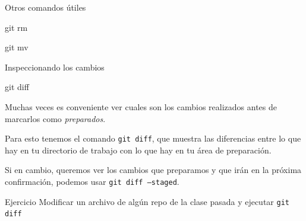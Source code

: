 \begin{frame}[t]{Otros comandos útiles}
    \begin{comando}
        git rm
    \end{comando}


    \vspace{2em}

    \begin{comando}
        git mv
    \end{comando}

\end{frame}

\begin{frame}[t]{Inspeccionando los cambios}
    \begin{comando}
        git diff
    \end{comando}

    \pause
    \begin{block}{}
        Muchas veces es conveniente ver cuales son los cambios realizados antes de marcarlos como \textit{preparados}.

        Para esto tenemos el comando \texttt{git diff}, que muestra las diferencias entre lo que hay en
        tu directorio de trabajo con lo que hay en tu área de preparación.

        \vspace{1em}

        Si en cambio, queremos ver los cambios que preparamos y que irán en la próxima confirmación, podemos usar \texttt{git diff --staged}.
    \end{block}

    \pause
    \begin{ejercicio}{Ejercicio}
        Modificar un archivo de algún repo de la clase pasada y ejecutar \texttt{git diff}
    \end{ejercicio}
\end{frame}

